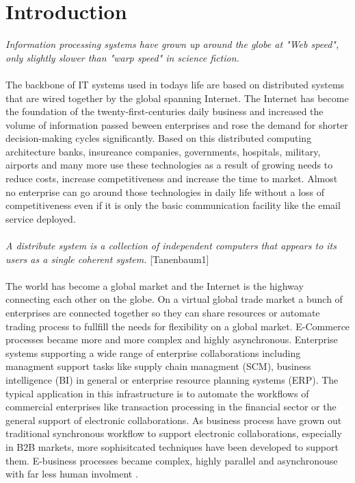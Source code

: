 \documentclass[a4paper,titlepage,11pt,DIV10,BCOR0.5cm,headinclude]{article}
\begin{document}
\parindent 0pt

\tableofcontents
\newpage
\section{Introduction}
\textit{Information processing systems have grown up around the globe at "Web speed", only slightly slower than "warp speed" in science fiction.} \cite{Luckham05}
\\\\
The backbone of IT systems used in todays life are based on distributed systems that are wired together by the global spanning Internet. The Internet has become the foundation of the twenty-first-centuries daily business and increased the volume of information passed beween enterprises and rose the demand for shorter decision-making cycles significantly. Based on this distributed computing architecture banks, insureance companies, governments, hospitals, military, airports and many more use these technologies as a result of growing needs to reduce costs, increase competitiveness and increase the time to market. Almost no enterprise can go around those technologies in daily life without a loss of competitiveness even if it is only the basic communication facility like the email service deployed.
\\\\
\textit{A distribute system is a collection of independent computers that appears to its users as a single coherent system.} [Tanenbaum1]
\\\\
The world has become a global market and the Internet is the highway connecting each other on the globe. On a virtual global trade market a bunch of enterprises are connected together so they can share resources or automate trading process to fullfill the needs for flexibility on a global market. E-Commerce processes became more and more complex and highly asynchronous. Enterprise systems supporting a wide range of enterprise collaborations including managment support tasks like supply chain managment (SCM), business intelligence (BI) in general or enterprise resource planning systems (ERP). The typical application in this infrastructure is to automate the workflows of commercial enterprises like transaction processing in the financial sector or the general support of electronic collaborations. As business process have grown out traditional synchronous workflow to support electronic collaborations, especially in B2B markets, more sophisitcated techniques have been developed to support them. E-business processes became complex, highly parallel and asynchronouse with far less human involment \cite{LuckhamManensPark}. 
\end{document}
